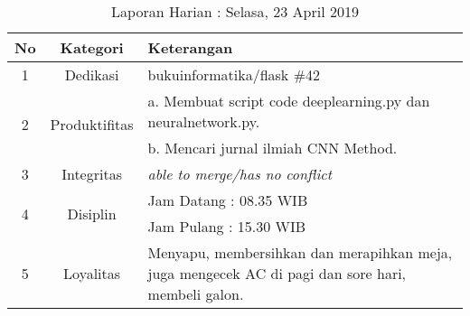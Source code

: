 \begin{table}[htp]
\begin{center}
\caption{Laporan Harian : Selasa, 23 April 2019}
\label{tab:lh230419}
\begin{tabularx}{\textwidth}{|l|l|X|}
\hline
\multicolumn{1}{|c|}{\textbf{No}} & \multicolumn{1}{c|}{\textbf{Kategori}} & \textbf{Keterangan} \\ \hline
\multicolumn{1}{|c|}{\multirow{1}{*}{1}} & \multicolumn{1}{c|}{\multirow{1}{*}{\parbox{2.5cm}{Dedikasi}}}
& bukuinformatika/flask \#42\\
\hline
\multicolumn{1}{|c|}{\multirow{2}{*}{2}} & \multicolumn{1}{c|}{\multirow{2}{*}{\parbox{2.5cm}{Produktifitas}}}
& a. Membuat script code deeplearning.py dan neuralnetwork.py.\\
\multicolumn{1}{|c|}{\multirow{1}{*}{}} & \multicolumn{1}{c|}{\multirow{1}{*}{\parbox{2.5cm}{}}}
& b. Mencari jurnal ilmiah CNN Method.\\
\hline
\multicolumn{1}{|c|}{\multirow{1}{*}{3}} & \multicolumn{1}{c|}{\multirow{1}{*}{\parbox{2.5cm}{Integritas}}}
& \textit{able to merge/has no conflict} \\
\hline
\multicolumn{1}{|c|}{\multirow{2}{*}{4}} & \multicolumn{1}{c|}{\multirow{2}{*}{\parbox{2.5cm}{Disiplin}}}
& Jam Datang : 08.35 WIB \\
\multicolumn{1}{|c|}{\multirow{1}{*}{}} & \multicolumn{1}{c|}{\multirow{1}{*}{\parbox{2.5cm}{}}}
& Jam Pulang : 15.30 WIB \\
\hline
\multicolumn{1}{|c|}{\multirow{2}{*}{5}} & \multicolumn{1}{c|}{\multirow{2}{*}{\parbox{2.5cm}{Loyalitas}}}
& Menyapu, membersihkan dan merapihkan meja, juga mengecek AC di pagi dan sore hari, membeli galon.\\
\hline
\end{tabularx}
\end{center}
\end{table}
